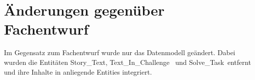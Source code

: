 
\chapter{Änderungen gegenüber Fachentwurf}

Im Gegensatz zum Fachentwurf wurde nur das Datenmodell geändert. Dabei wurden die Entitäten \glqq Story\_Text\grqq , \glqq Text\_In\_Challenge \grqq~und \glqq Solve\_Task\grqq~entfernt und ihre Inhalte in anliegende Entities integriert.



